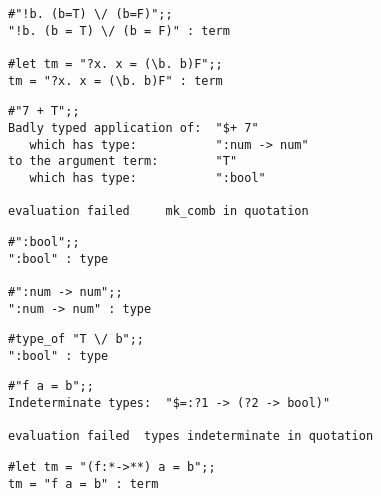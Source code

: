 
\vskip4mm
\begin{session}\begin{verbatim}
#"!b. (b=T) \/ (b=F)";;
"!b. (b = T) \/ (b = F)" : term

#let tm = "?x. x = (\b. b)F";;
tm = "?x. x = (\b. b)F" : term
\end{verbatim}\end{session}
\vskip5mm

\vskip4mm
\begin{session}\begin{verbatim}
#"7 + T";;
Badly typed application of:  "$+ 7"
   which has type:           ":num -> num"
to the argument term:        "T"
   which has type:           ":bool"

evaluation failed     mk_comb in quotation
\end{verbatim}\end{session}


\vskip4mm
\begin{session}\begin{verbatim}
#":bool";;
":bool" : type

#":num -> num";;
":num -> num" : type
\end{verbatim}\end{session}

\vskip4mm
\begin{session}\begin{verbatim}
#type_of "T \/ b";;
":bool" : type
\end{verbatim}\end{session}

\vskip4mm
\begin{session}\begin{verbatim}
#"f a = b";;
Indeterminate types:  "$=:?1 -> (?2 -> bool)"

evaluation failed  types indeterminate in quotation
\end{verbatim}\end{session}


\vskip4mm
\begin{session}\begin{verbatim}
#let tm = "(f:*->**) a = b";;
tm = "f a = b" : term
\end{verbatim}\end{session}



